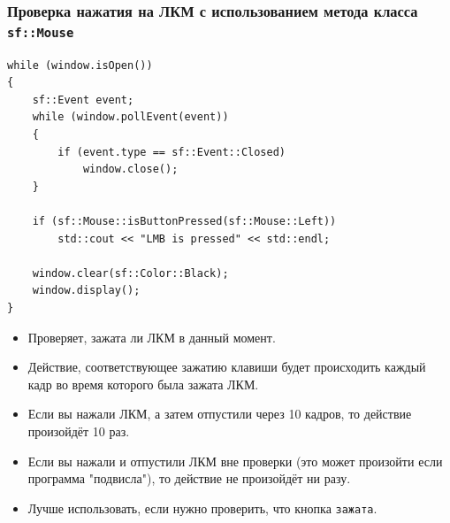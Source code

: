 \documentclass{article}
\begin{document}
\subsubsection*{Проверка нажатия на ЛКМ с использованием метода класса \texttt{sf::Mouse}}
\begin{minipage}{0.64\textwidth}
\begin{lstlisting}[frame=none]
while (window.isOpen()) 
{
    sf::Event event;
    while (window.pollEvent(event)) 
    {
        if (event.type == sf::Event::Closed)
            window.close();
    }
	
	if (sf::Mouse::isButtonPressed(sf::Mouse::Left))  
		std::cout << "LMB is pressed" << std::endl; 
    
    window.clear(sf::Color::Black);
    window.display();
}
\end{lstlisting}
\end{minipage}
\begin{minipage}{0.36\textwidth}
\begin{itemize}
\item Проверяет, зажата ли ЛКМ в данный момент.
\item Действие, соответствующее зажатию клавиши будет происходить каждый кадр во время которого была зажата ЛКМ.
\item Если вы нажали ЛКМ, а затем отпустили через 10 кадров, то действие произойдёт 10 раз.
\item Если вы нажали и отпустили ЛКМ вне проверки (это может произойти если программа "подвисла"), то действие не произойдёт ни разу.
\item Лучше использовать, если нужно проверить, что кнопка \texttt{зажата}.
\end{itemize}
\end{minipage}
\end{document}
